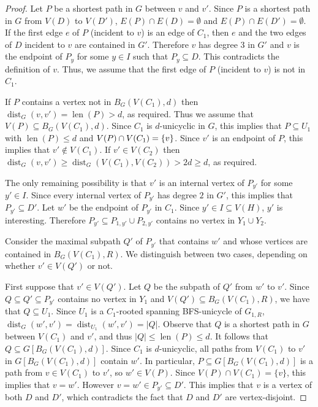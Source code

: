 \documentclass{patmorin}
\newcommand{\gwen}[1]{\textcolor{Purple}{Gwen: #1}}
\newcommand{\piotr}[1]{\textcolor{red}{Piotr: #1}}
\DeclareMathOperator{\len}{len}
\DeclareMathOperator{\dist}{dist}
\DeclarePairedDelimiter\set{\{}{\}}
\begin{document}
\begin{proof}
    
    Let $P$ be a shortest path in $G$ between $v$ and $v'$.  Since $P$ is a shortest path in $G$ from $V(D)$ to $V(D')$, $E(P)\cap E(D)=\emptyset$ and $E(P)\cap E(D')=\emptyset$.  If the first edge $e$ of $P$ (incident to $v$) is an edge of $C_1$, then $e$ and the two edges of $D$ incident to $v$ are contained in $G'$. Therefore $v$ has degree $3$ in $G'$ and $v$ is the endpoint of $P_y$ for some $y\in I$ such that $P_y\subseteq D$.  This contradicts the definition of $v$.
    Thus, we assume that the first edge of $P$ (incident to $v$) is not in $C_1$. 

    If $P$ contains a vertex not in $B_G(V(C_1),d)$ then $\dist_G(v,v')=\len(P)>d$, as required.  Thus we assume that $V(P)\subseteq B_G(V(C_1),d)$. 
    Since $C_1$ is $d$-unicyclic in $G$, this implies that $P\subseteq U_1$ with $\len(P)\leq d$ and $V(P)\cap V(C_1)=\set{v}$.     
    Since $v'$ is an endpoint of $P$, this implies that $v'\notin V(C_1)$.  If $v'\in V(C_2)$ then $\dist_G(v,v')\ge \dist_G(V(C_1),V(C_2))>2d\geq d$, as required.

    The only remaining possibility is that $v'$ is an internal vertex of $P_{y'}$ for some $y'\in I$.  Since every internal vertex of $P_{y'}$ has degree $2$ in $G'$, this implies that  $P_{y'}\subseteq D'$.  
    Let $w'$ be the endpoint of $P_{y'}$ in $C_1$. Since $y'\in I\subseteq V(H)$, $y'$ is interesting.  
    Therefore $P_{y'}\subseteq P_{1,y'}\cup P_{2,y'}$ contains no vertex in $Y_1\cup Y_2$.

    Consider the maximal subpath $Q'$ of $P_{y'}$ that contains $w'$ and whose vertices are contained in $B_G(V(C_1),R)$.  We distinguish between two cases, depending on whether $v'\in V(Q')$ or not.

    First suppose that $v'\in V(Q')$.  
    Let $Q$ be the subpath of $Q'$ from $w'$ to $v'$. Since $Q\subseteq Q'\subseteq P_{y'}$ contains  no vertex in $Y_1$ and $V(Q')\subseteq B_G(V(C_1),R)$, we have that $Q\subseteq U_1$. Since $U_1$ is a $C_1$-rooted spanning BFS-unicycle of $G_{1,R}$, $\dist_G(w',v')=\dist_{U_1}(w',v')=|Q|$.  
    Observe that $Q$ is a shortest path in $G$ between $V(C_1)$ and $v'$, and thus $|Q| \leq \len(P) \leq d$. 
    It follows that $Q\subseteq G[B_G(V(C_1),d)]$.  
    Since $C_1$ is $d$-unicyclic, all paths from $V(C_1)$ to $v'$ in $G[B_G(V(C_1),d)]$ contain $w'$. 
    In particular, $P\subseteq G[B_G(V(C_1),d)]$ is a path from $v\in V(C_1)$ to $v'$, so $w'\in V(P)$.  Since $V(P)\cap V(C_1)=\{v\}$, this implies that $v=w'$. 
    However $v=w' \in P_{y'}\subseteq D'$. This implies that $v$ is a vertex of both $D$ and $D'$, which contradicts the fact that $D$ and $D'$ are vertex-disjoint.


\end{proof}
\end{document}
